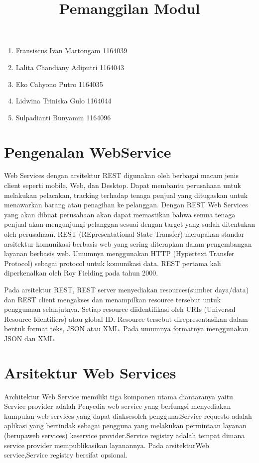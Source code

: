 \documentclass[12pt,a4paper]{article}
\begin{document}
\title{Pemanggilan Modul}
\maketitle
\begin{enumerate}
\item Fransiscus Ivan Martongam      1164039 \\
\item Lalita Chandiany Adiputri      1164043\\
\item Eko Cahyono Putro              1164035\\
\item Lidwina Triniska Gulo          1164044\\
\item Sulpadianti Bunyamin           1164096\\
\end{enumerate}


\section{Pengenalan WebService}
Web Services dengan arsitektur REST digunakan oleh berbagai macam jenis client seperti mobile, Web, dan Desktop.
Dapat membantu perusahaan untuk melakukan pelacakan, tracking terhadap tenaga penjual yang ditugaskan untuk menawarkan 
barang atau penagihan ke pelanggan. Dengan REST Web Services yang akan dibuat perusahaan akan dapat memastikan
bahwa semua tenaga penjual akan mengunjungi pelanggan sesuai dengan target yang sudah ditentukan oleh perusahaan.
REST (REpresentational State Transfer) merupakan standar arsitektur komunikasi berbasis web yang sering diterapkan dalam pengembangan layanan berbasis web. Umumnya menggunakan HTTP (Hypertext Transfer Protocol) sebagai protocol untuk komunikasi data. REST pertama kali diperkenalkan oleh Roy Fielding pada tahun 2000.

Pada arsitektur REST, REST server menyediakan resources(sumber daya/data) dan REST client mengakses dan menampilkan resource tersebut untuk penggunaan selanjutnya. Setiap resource diidentifikasi oleh URIs (Universal Resource Identifiers) atau global ID. Resource tersebut direpresentasikan dalam bentuk format teks, JSON atau XML. Pada umumnya formatnya menggunakan JSON dan XML.


\section{Arsitektur Web Services}
Architektur Web Service memiliki tiga komponen utama diantaranya yaitu Service provider adalah Penyedia web service yang berfungsi
menyediakan kumpulan web services yang dapat diaksesoleh pengguna.Service requesto adalah aplikasi yang bertindak sebagai pengguna yang
melakukan permintaan layanan (berupaweb services) keservice provider.Service registry adalah tempat dimana service provider 
mempublikasikan layanannya. Pada arsitekturWeb service,Service registry bersifat opsional.
\end{document}
